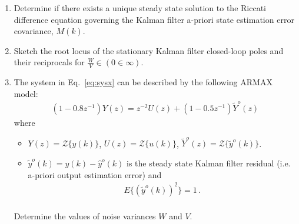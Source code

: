 \begin{enumerate}
    \item
    Determine if there exists a unique steady state solution to the Riccati difference equation governing the Kalman filter a-priori state estimation error covariance, $M(k)$.

    \item
    Sketch the  root locus of the stationary Kalman filter closed-loop poles and their reciprocals for
    $\frac{W}{V} \in (0 \in \infty)$.

    \item
    The system in Eq.~\eqref{eq:sysx} can be described by the following ARMAX model:
    \begin{align*}
        (1 - 0.8 z^{-1}) Y(z) = z^{-2} U(z) + (1 - 0.5 z^{-1}) \tilde{Y}^o(z)
    \end{align*}
    where
    \begin{itemize}
        \item
        $Y(z) = \mathcal{Z} \{y(k)\}$, $U(z) = \mathcal{Z} \{u(k)\}$, $\tilde{Y}^o(z) = \mathcal{Z} \{\tilde y^o(k)\}$.

        \item
        $\tilde y^o(k) = y(k) - \hat{y}^o(k)$ is the steady state Kalman filter residual (i.e. a-priori output estimation error) and
        \begin{align*}
            E\{ (\tilde{y}^o(k))^2 \} = 1\,.\\
        \end{align*}
    \end{itemize}
    Determine the values of noise variances $W$ and $V$.
\end{enumerate}


